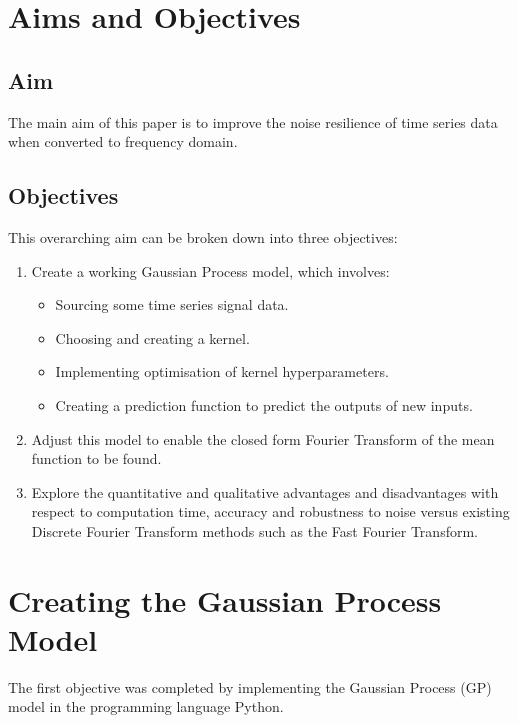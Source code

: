 \documentclass[12pt]{article}
\begin{document}
    \section{Aims and Objectives}
    \subsection{Aim}
    The main aim of this paper is to improve the noise resilience of time series data when converted to frequency domain.

    \subsection{Objectives}
    This overarching aim can be broken down into three objectives:
        \begin{enumerate}
            \item Create a working Gaussian Process model, which involves:
                \begin{itemize}
                    \item Sourcing some time series signal data.
                    \item Choosing and creating a kernel.
                    \item Implementing optimisation of kernel hyperparameters. \label{item:nll}
                    \item Creating a prediction function to predict the outputs of new inputs. \label{item:predict}
                \end{itemize}
            \item Adjust this model to enable the closed form Fourier Transform of the mean function to be found.
            \item Explore the quantitative and qualitative advantages and disadvantages with respect to computation time, accuracy and robustness to noise versus existing Discrete Fourier Transform methods such as the Fast Fourier Transform.\label{noise-resilience}
        \end{enumerate}

    \section{Creating the Gaussian Process Model}
    The first objective was completed by implementing the Gaussian Process (GP) model in the programming language Python.
\end{document}
